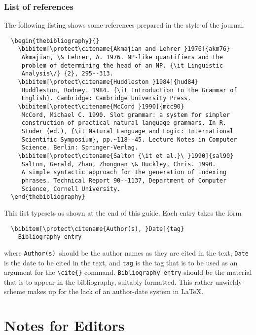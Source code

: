 \documentclass{nle}
\begin{document}
\subsubsection{List of references}\label{fullref}

The following listing shows some references prepared in the style of the
journal.
%
{\fontsize{7}{9}\selectfont
\begin{verbatim}
  \begin{thebibliography}{}
    \bibitem[\protect\citename{Akmajian and Lehrer }1976]{akm76}
     Akmajian, \& Lehrer, A. 1976. NP-like quantifiers and the
     problem of determining the head of an NP. {\it Linguistic
     Analysis\/} {2}, 295--313.
    \bibitem[\protect\citename{Huddleston }1984]{hud84}
     Huddleston, Rodney. 1984. {\it Introduction to the Grammar of
     English}. Cambridge: Cambridge University Press.
    \bibitem[\protect\citename{McCord }1990]{mcc90}
     McCord, Michael C. 1990. Slot grammar: a system for simpler
     construction of practical natural language grammars. In R.
     Studer (ed.), {\it Natural Language and Logic: International
     Scientific Symposium}, pp.~118--45. Lecture Notes in Computer
     Science. Berlin: Springer-Verlag.
    \bibitem[\protect\citename{Salton {\it et al.}\ }1990]{sal90}
     Salton, Gerald, Zhao, Zhongnan \& Buckley, Chris. 1990.
     A simple syntactic approach for the generation of indexing
     phrases. Technical Report 90--1137, Department of Computer
     Science, Cornell University.
  \end{thebibliography}
\end{verbatim}}
%
This list typesets as shown at the end of this guide.
Each entry takes the form
%
\begin{verbatim}
  \bibitem[\protect\citename{Author(s), }Date]{tag}
    Bibliography entry
\end{verbatim}
%
where \verb"Author(s)"\ should be the author names as they are cited in
the text, \verb"Date" is the date to be cited in the text, and \verb"tag"
is the tag that is to be used as an argument for the \verb"\cite{}" command.
\verb"Bibliography entry" should be the
material that is to appear in the bibliography, suitably formatted.  This
rather unwieldy scheme makes up for the lack of an author-date system in
\LaTeX.

\section{Notes for Editors}
\end{document}
